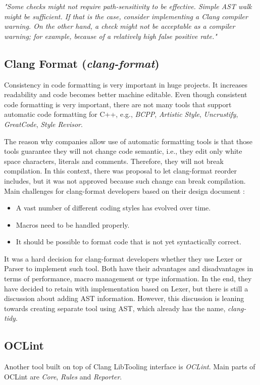 \label{clang-analyzer-checkers}
\emph{"Some checks might not require path-sensitivity to be effective. Simple AST walk might be sufficient. If that is the case, consider implementing a Clang compiler warning. On the other hand, a check might not be acceptable as a compiler warning; for example, because of a relatively high false positive rate."}

\subsection{Clang Format (\emph{clang-format})}
\label{clang-format}
Consistency in code formatting is very important in huge projects. It increases readability and code becomes better machine editable. Even though consistent code formatting is very important, there are not many tools that support automatic code formatting for C++, e.g., \emph{BCPP}, \emph{Artistic Style}, \emph{Uncrustify}, \emph{GreatCode}, \emph{Style Revisor}.

The reason why companies allow use of automatic formatting tools is that those tools guarantee they will not change code semantic, i.e., they edit only white space characters, literals and comments. Therefore, they will not break compilation. In this context, there was proposal to let clang-format reorder includes, but it was not approved because such change can break compilation. Main challenges for clang-format developers based on their design document \cite{clang-format-design}:

\begin{itemize}
\item A vast number of different coding styles has evolved over time.
\item Macros need to be handled properly.
\item It should be possible to format code that is not yet syntactically correct.
\end{itemize}

It was a hard decision for clang-format developers whether they use Lexer or Parser to implement such tool. Both have their advantages and disadvantages in terms of performance, macro management or type information. In the end, they have decided to retain with implementation based on Lexer, but there is still a discussion about adding AST information. However, this discussion is leaning towards creating separate tool using AST, which already has the name, \emph{clang-tidy}.

\subsection{OCLint}
Another tool built on top of Clang LibTooling interface is \emph{OCLint}. Main parts of OCLint are \emph{Core}, \emph{Rules} and \emph{Reporter}.

